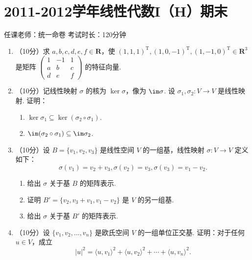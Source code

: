 \section{2011-2012学年线性代数I（H）期末}

\begin{center}
    任课老师：统一命卷\hspace{4em} 考试时长：120分钟
\end{center}

\begin{enumerate}
    \item （10分）求 $a,b,c,d,e,f\in \mathbf{R}$，使 $(1,1,1)^\mathrm{T},(1,0,-1)^\mathrm{T},(1,-1,0)^\mathrm{T}\in \mathbf{R}^3$ 是矩阵 $\begin{pmatrix}1 & -1 & 1 \\ a & b & c \\ d & e & f\end{pmatrix}$ 的特征向量.

    \item （10分）记线性映射 $\sigma$ 的核为 $\ker \sigma$，像为 $\im \sigma$.  设 $\sigma_1,\sigma_2\colon V\to V$ 是线性映射. 证明：
    \begin{enumerate}
        \item $\ker \sigma_1 \subseteq \ker (\sigma_2 \circ \sigma_1)$.

        \item $\im (\sigma_2 \circ \sigma_1) \subseteq \im \sigma_2$.
    \end{enumerate}

\item （10分）设 $B=\{v_1,v_2,v_3\}$ 是线性空间 $V$ 的一组基，线性映射 $\sigma\colon V\to V$ 定义如下：
    \[\sigma(v_1)=v_2+v_3,\sigma(v_2)=v_3,\sigma(v_3)=v_1-v_2.\]
    \begin{enumerate}
        \item 给出 $\sigma$ 关于基 $B$ 的矩阵表示.

        \item 证明 $B'=\{v_2,v_3+v_1,v_1-v_2\}$ 是 $V$ 的另一组基.

        \item 给出 $\sigma$ 关于基 $B'$ 的矩阵表示.
    \end{enumerate}

\item （10分）设 $\{v_1,v_2,\ldots,v_n\}$ 是欧氏空间 $V$ 的一组单位正交基. 证明：对于任何 $u\in V$，成立
    \[\lvert u \rvert^2 = \langle u,v_1\rangle^2+\langle u,v_2\rangle^2+\cdots+\langle u,v_n\rangle^2.\]


\end{enumerate}
